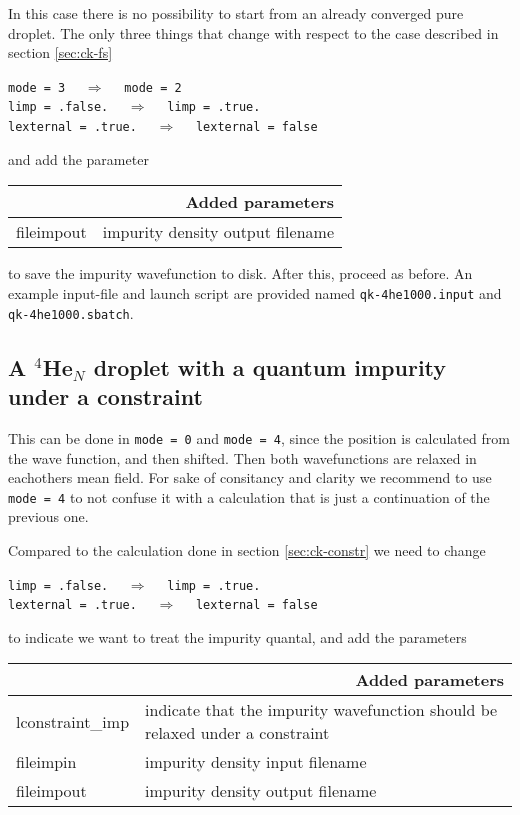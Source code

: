 \documentclass[10pt,a4paper]{article}
\begin{document}
	In this case there is no possibility to start from an already converged pure droplet. The only three things that change with respect to the case described in section \ref{sec:ck-fs}
	\begin{center}
		\verb|mode = 3|	$\quad\Longrightarrow\quad$	\verb|mode = 2| \\
		\verb|limp = .false.|	$\quad\Longrightarrow\quad$	\verb|limp = .true.| \\
		\verb|lexternal = .true.|	$\quad\Longrightarrow\quad$	\verb|lexternal = false|
	\end{center}
		
	and add the parameter
	\begin{center}
	\begin{tabular}{l|p{9.75cm}}
		\multicolumn{2}{r}{\textbf{Added parameters}} \\
		\hline\hline
		fileimpout			&  impurity density output filename  
	\end{tabular}
	\end{center}
	to save the impurity wavefunction to disk. After this, proceed as before. An example input-file and launch script are provided named \verb|qk-4he1000.input| and \verb|qk-4he1000.sbatch|.

	\subsection{A $^4$He$_{N}$ droplet with a quantum impurity under a constraint}
	
	This can be done in \verb|mode = 0| and \verb|mode = 4|, since the position is calculated from the wave function, and then shifted. Then both wavefunctions are relaxed in eachothers mean field. For sake of consitancy and clarity we recommend to use \verb|mode = 4| to not confuse it with a calculation that is just a continuation of the previous one.
	
	Compared to the calculation done in section \ref{sec:ck-constr} we need to change
	
		\begin{center}
		\verb|limp = .false.|	$\quad\Longrightarrow\quad$	\verb|limp = .true.| \\
		\verb|lexternal = .true.|	$\quad\Longrightarrow\quad$	\verb|lexternal = false|
	\end{center}
	
	to indicate we want to treat the impurity quantal, and add the parameters
	
	\begin{center}
		\begin{tabular}{l|p{9.75cm}}
			\multicolumn{2}{r}{\textbf{Added parameters}} \\
			\hline\hline
			 lconstraint\_imp			&  indicate that the impurity wavefunction should be relaxed under a constraint  \\
			 fileimpin		&	impurity density input filename \\
			 fileimpout		&	impurity density output filename
		\end{tabular}
	\end{center}
\end{document}
